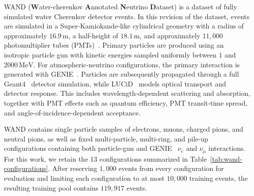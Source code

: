 

  WAND (\textbf{W}ater-cherenkov \textbf{A}nnotated \textbf{N}eutrino \textbf{D}ataset) is a dataset of fully simulated water Cherenkov detector events. In this revision of the dataset, events are simulated in a Super-Kamiokande-like cylindrical geometry
  with a radius of approximately \(16.9\,\mathrm{m}\), a half-height of \(18.1\,\mathrm{m}\), and approximately \(11{,}000\) photomultiplier tubes (PMTs)~\citep{fukuda2003superkamiokande}.
  Primary particles are produced using an isotropic particle gun with kinetic energies sampled uniformly between \(1\) and \(2000\,\mathrm{MeV}\). For
  atmospheric-neutrino configurations, the primary interaction is generated with {GENIE}~\citep{genie}. Particles are subsequently propagated through a full
  {Geant4}~\cite{geant4} detector simulation, while LUCiD~\citep{lucid} models optical transport and detector response. This includes wavelength-dependent scattering and absorption, together with PMT effects such as quantum efficiency, PMT transit-time spread, and angle-of-incidence-dependent acceptance.

  WAND contains single particle samples of electrons, muons, charged pions, and neutral pions, as well as fixed multi-particle, multi-ring, and pile-up
  configurations containing both particle-gun and \textsc{GENIE}~\citep{genie} \(\nu_e\) and \(\nu_\mu\) interactions. For this work, we retain the 13 configurations summarized in Table~\ref{tab:wand-configurations}. After reserving \(1{,}000\) events from every configuration for evaluation and limiting each configuration to at most \(10{,}000\) training events, the resulting training pool contains \(119{,}917\) events.


